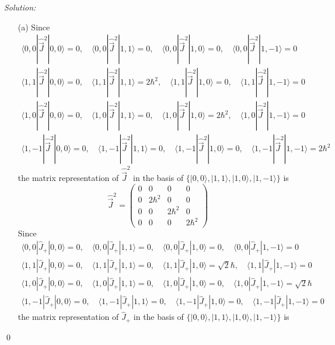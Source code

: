 \documentclass[10pt,a4paper]{article}
\newenvironment{sol}
    {\emph{Solution:}
    }
    {
    \qed
    }
\begin{document}
\begin{sol}
\begin{itemize}
\item[(a)] Since
\begin{gather}
\langle0,0|\hat{\vec{J}}^2|0,0\rangle=0,\quad\langle0,0|\hat{\vec{J}}^2|1,1\rangle=0,\quad\langle0,0|\hat{\vec{J}}^2|1,0\rangle=0,\quad\langle0,0|\hat{\vec{J}}^2|1,-1\rangle=0\\
\langle1,1|\hat{\vec{J}}^2|0,0\rangle=0,\quad\langle1,1|\hat{\vec{J}}^2|1,1\rangle=2\hbar^2,\quad\langle1,1|\hat{\vec{J}}^2|1,0\rangle=0,\quad\langle1,1|\hat{\vec{J}}^2|1,-1\rangle=0\\
\langle1,0|\hat{\vec{J}}^2|0,0\rangle=0,\quad\langle1,0|\hat{\vec{J}}^2|1,1\rangle=0,\quad\langle1,0|\hat{\vec{J}}^2|1,0\rangle=2\hbar^2,\quad\langle1,0|\hat{\vec{J}}^2|1,-1\rangle=0\\
\langle1,-1|\hat{\vec{J}}^2|0,0\rangle=0,\quad\langle1,-1|\hat{\vec{J}}^2|1,1\rangle=0,\quad\langle1,-1|\hat{\vec{J}}^2|1,0\rangle=0,\quad\langle1,-1|\hat{\vec{J}}^2|1,-1\rangle=2\hbar^2
\end{gather}
the matrix representation of $\hat{\vec{J}}^2$ in the basis of $\{|0,0\rangle,|1,1\rangle,|1,0\rangle,|1,-1\rangle\}$ is
\begin{equation}
\hat{\vec{J}}^2=\left(\begin{array}{cccc}
0&0&0&0\\
0&2\hbar^2&0&0\\
0&0&2\hbar^2&0\\
0&0&0&2\hbar^2
\end{array}\right)
\end{equation}
Since
\begin{gather}
\langle0,0|\hat{J}_+|0,0\rangle=0,\quad\langle0,0|\hat{J}_+|1,1\rangle=0,\quad\langle0,0|\hat{J}_+|1,0\rangle=0,\quad\langle0,0|\hat{J}_+|1,-1\rangle=0\\
\langle1,1|\hat{J}_+|0,0\rangle=0,\quad\langle1,1|\hat{J}_+|1,1\rangle=0,\quad\langle1,1|\hat{J}_+|1,0\rangle=\sqrt{2}\hbar,\quad\langle1,1|\hat{J}_+|1,-1\rangle=0\\
\langle1,0|\hat{J}_+|0,0\rangle=0,\quad\langle1,0|\hat{J}_+|1,1\rangle=0,\quad\langle1,0|\hat{J}_+|1,0\rangle=0,\quad\langle1,0|\hat{J}_+|1,-1\rangle=\sqrt{2}\hbar\\
\langle1,-1|\hat{J}_+|0,0\rangle=0,\quad\langle1,-1|\hat{J}_+|1,1\rangle=0,\quad\langle1,-1|\hat{J}_+|1,0\rangle=0,\quad\langle1,-1|\hat{J}_+|1,-1\rangle=0
\end{gather}
the matrix representation of $\hat{J}_+$ in the basis of $\{|0,0\rangle,|1,1\rangle,|1,0\rangle,|1,-1\rangle\}$ is

\end{itemize}
\end{sol}
\end{document}
